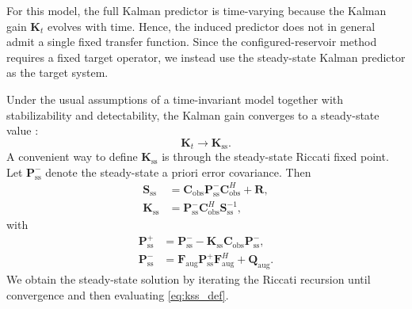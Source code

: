 \documentclass[lettersize,journal]{IEEEtran}
\begin{document}
For this model, the full Kalman predictor is time-varying because the Kalman gain $\mathbf{K}_t$ evolves with time. 
Hence, the induced predictor does not in general admit a single fixed transfer function. 
Since the configured-reservoir method requires a fixed target operator, we instead use the steady-state Kalman predictor as the target system.

Under the usual assumptions of a time-invariant model together with stabilizability and detectability, the Kalman gain converges to a steady-state value \cite{simon_optimal_state_estimation}:
\begin{equation}
\mathbf{K}_t \rightarrow \mathbf{K}_{\mathrm{ss}}.
\end{equation}
A convenient way to define $\mathbf{K}_{\mathrm{ss}}$ is through the steady-state Riccati fixed point. Let $\mathbf{P}^{-}_{\mathrm{ss}}$ denote the steady-state a priori error covariance. Then
\begin{align}
\mathbf{S}_{\mathrm{ss}}
&=
\mathbf{C}_{\mathrm{obs}}\mathbf{P}^{-}_{\mathrm{ss}}\mathbf{C}_{\mathrm{obs}}^H
+
\mathbf{R},\\
\mathbf{K}_{\mathrm{ss}}
&=
\mathbf{P}^{-}_{\mathrm{ss}}\mathbf{C}_{\mathrm{obs}}^H\mathbf{S}_{\mathrm{ss}}^{-1},
\label{eq:kss_def}
\end{align}
with
\begin{align}
\mathbf{P}^{+}_{\mathrm{ss}}
&=
\mathbf{P}^{-}_{\mathrm{ss}}
-
\mathbf{K}_{\mathrm{ss}}\mathbf{C}_{\mathrm{obs}}\mathbf{P}^{-}_{\mathrm{ss}},\\
\mathbf{P}^{-}_{\mathrm{ss}}
&=
\mathbf{F}_{\mathrm{aug}}\mathbf{P}^{+}_{\mathrm{ss}}\mathbf{F}_{\mathrm{aug}}^H
+
\mathbf{Q}_{\mathrm{aug}}.
\label{eq:ss_riccati_fp}
\end{align}
We obtain the steady-state solution by iterating the Riccati recursion until convergence and then evaluating \eqref{eq:kss_def}.
\end{document}

